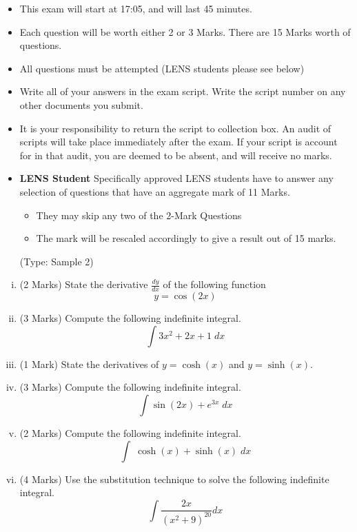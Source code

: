\documentclass[11pt]{article} %
\begin{document}
	\begin{itemize} 
		\item This exam will start at 17:05, and will last 45 minutes.
		
		\item Each question will be worth either 2 or 3 Marks. There are 15 Marks worth of questions.
		\item All questions must be attempted (LENS students please see below)
		
		\item Write all of your answers in the exam script. Write the script number on any other documents you submit.
		
		\item It is your responsibility to return the script to collection box. An audit of scripts will take place immediately after the exam. If your script is account for in that audit,  you are deemed to be absent, and will receive no marks.
		
		\item \textbf{LENS Student}
		Specifically approved LENS students have to answer any selection of questions that have an aggregate mark of 11 Marks.  
		\begin{itemize}
			\item They may skip any two of the 2-Mark Questions
			\item The mark will be rescaled accordingly to give a result out of 15 marks.
		\end{itemize}
		(Type: Sample 2)		
		
	\end{itemize}
\newpage
\begin{enumerate}[(i)]
	\item (2 Marks) State the derivative $\displaystyle \frac{dy}{dx}$ of the following function
	\[y = \cos(2x)\]
	\item (3 Marks) Compute the following indefinite integral.
	\[ \int 3x^2 + 2x + 1 \; dx \]
	
\newpage	
	\item (1 Mark) State the derivatives of 
	$y = \cosh (x)$ and $y = \sinh(x)$.
\bigskip
	\item (3 Marks) Compute the following indefinite integral.
			\[ \int \sin(2x)  + e^{3x} \; dx \]

\newpage
	\item (2 Marks) Compute the following indefinite integral.
{\Large	\[  \int  \;\cosh(x) + \sinh(x) \; dx\]
}
\newpage	


	\item (4 Marks) Use the substitution technique to solve the following indefinite integral.
		\[  \int  \frac{2x}{(x^2+9)^{20} } dx\]
\end{enumerate}

\end{document}
